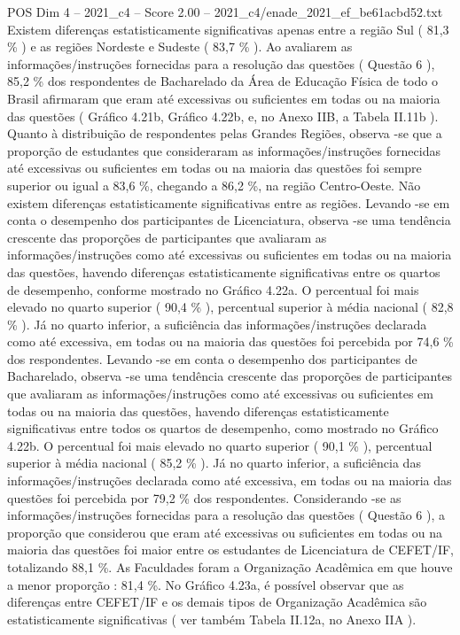 \begin{textsample}{POS Dim 4 – 2021\_c4 – Score 2.00 – 2021\_c4/enade\_2021\_ef\_be61acbd52.txt}
Existem diferenças estatisticamente significativas apenas entre a região Sul ( 81,3 \% ) e as regiões Nordeste e Sudeste ( 83,7 \% ).
Ao avaliarem as informações/instruções fornecidas para a resolução das questões ( Questão 6 ), 85,2 \% dos respondentes de Bacharelado da Área de Educação Física de todo o Brasil afirmaram que eram até excessivas ou suficientes em todas ou na maioria das questões ( Gráfico 4.21b, Gráfico 4.22b, e, no Anexo IIB, a Tabela II.11b ).
Quanto à distribuição de respondentes pelas Grandes Regiões, observa -se que a proporção de estudantes que consideraram as informações/instruções fornecidas até excessivas ou suficientes em todas ou na maioria das questões foi sempre superior ou igual a 83,6 \%, chegando a 86,2 \%, na região Centro-Oeste.
Não existem diferenças estatisticamente significativas entre as regiões.
Levando -se em conta o desempenho dos participantes de Licenciatura, observa -se uma tendência crescente das proporções de participantes que avaliaram as informações/instruções como até excessivas ou suficientes em todas ou na maioria das questões, havendo diferenças estatisticamente significativas entre os quartos de desempenho, conforme mostrado no Gráfico 4.22a.
O percentual foi mais elevado no quarto superior ( 90,4 \% ), percentual superior à média nacional ( 82,8 \% ).
Já no quarto inferior, a suficiência das informações/instruções declarada como até excessiva, em todas ou na maioria das questões foi percebida por 74,6 \% dos respondentes.
Levando -se em conta o desempenho dos participantes de Bacharelado, observa -se uma tendência crescente das proporções de participantes que avaliaram as informações/instruções como até excessivas ou suficientes em todas ou na maioria das questões, havendo diferenças estatisticamente significativas entre todos os quartos de desempenho, como mostrado no Gráfico 4.22b.
O percentual foi mais elevado no quarto superior ( 90,1 \% ), percentual superior à média nacional ( 85,2 \% ).
Já no quarto inferior, a suficiência das informações/instruções declarada como até excessiva, em todas ou na maioria das questões foi percebida por 79,2 \% dos respondentes.
Considerando -se as informações/instruções fornecidas para a resolução das questões ( Questão 6 ), a proporção que considerou que eram até excessivas ou suficientes em todas ou na maioria das questões foi maior entre os estudantes de Licenciatura de CEFET/IF, totalizando 88,1 \%.
As Faculdades foram a Organização Acadêmica em que houve a menor proporção : 81,4 \%.
No Gráfico 4.23a, é possível observar que as diferenças entre CEFET/IF e os demais tipos de Organização Acadêmica são estatisticamente significativas ( ver também Tabela II.12a, no Anexo IIA ).

\end{textsample}
